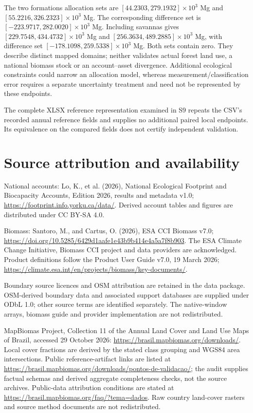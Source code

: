 \documentclass[11pt,a4paper]{article}
\begin{document}
The two formations allocation sets are $[44.2303,279.1932]\times10^3$ Mg and $[55.2216,326.2323]\times10^3$ Mg. The corresponding difference set is $[-223.9717,282.0020]\times10^3$ Mg. Including savannas gives $[229.7548,434.4732]\times10^3$ Mg and $[256.3634,489.2885]\times10^3$ Mg, with difference set $[-178.1098,259.5338]\times10^3$ Mg. Both sets contain zero. They describe distinct mapped domains; neither validates actual forest land use, a national biomass stock or an account--asset divergence. Additional ecological constraints could narrow an allocation model, whereas measurement/classification error requires a separate uncertainty treatment and need not be represented by these endpoints.

The complete XLSX reference representation examined in S9 repeats the CSV's recorded annual reference fields and supplies no additional paired local endpoints. Its equivalence on the compared fields does not certify independent validation.

\section*{Source attribution and availability}

National accounts: Lo, K., et al. (2026), National Ecological Footprint and Biocapacity Accounts, Edition 2026, results and metadata v1.0; \url{https://footprint.info.yorku.ca/data/}. Derived account tables and figures are distributed under CC BY-SA 4.0.

Biomass: Santoro, M., and Cartus, O. (2026), ESA CCI Biomass v7.0; \url{https://doi.org/10.5285/6429d1aafe1e43b9b414e4a5a7f8b903}. The ESA Climate Change Initiative, Biomass CCI project and data providers are acknowledged. Product definitions follow the Product User Guide v7.0, 19 March 2026; \url{https://climate.esa.int/en/projects/biomass/key-documents/}.

Boundary source licences and OSM attribution are retained in the data package. OSM-derived boundary data and associated support databases are supplied under ODbL 1.0; other source terms are identified separately. The native-window arrays, biomass guide and provider implementation are not redistributed.

MapBiomas Project, Collection 11 of the Annual Land Cover and Land Use Maps of Brazil, accessed 29 October 2026: \url{https://brasil.mapbiomas.org/downloads/}. Local cover fractions are derived by the stated class grouping and WGS84 area intersections. Public reference-artifact links are listed at \url{https://brasil.mapbiomas.org/downloads/pontos-de-validacao/}; the audit supplies factual schemas and derived aggregate completeness checks, not the source archives. Public-data attribution conditions are stated at \url{https://brasil.mapbiomas.org/faq/?tema=dados}. Raw country land-cover rasters and source method documents are not redistributed.
\end{document}
